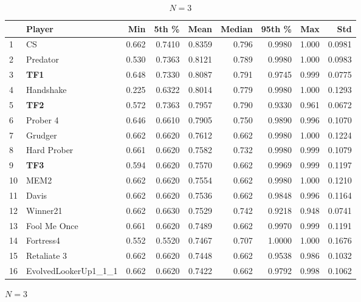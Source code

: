 \documentclass[10pt,letterpaper]{article}
\begin{document}
\begin{table}[!hbtp]
    \tiny
    \centering
    \begin{subfigure}[t]{\columnwidth}
        \centering
            \begin{tabular}{llrrrrrrr}
            \toprule
            {} &                Player &    Min &   5th \% &    Mean &  Median &  95th \% &    Max &     Std \\
            \midrule
            1  &                    CS &  0.662 &  0.7410 &  0.8359 &   0.796 &  0.9980 &  1.000 &  0.0981 \\
            2  &              Predator &  0.530 &  0.7363 &  0.8121 &   0.789 &  0.9980 &  1.000 &  0.0983 \\
            3  &                   \textbf{TF1} &  0.648 &  0.7330 &  0.8087 &   0.791 &  0.9745 &  0.999 &  0.0775 \\
            4  &             Handshake &  0.225 &  0.6322 &  0.8014 &   0.779 &  0.9980 &  1.000 &  0.1293 \\
            5  &                   \textbf{TF2} &  0.572 &  0.7363 &  0.7957 &   0.790 &  0.9330 &  0.961 &  0.0672 \\
            6  &              Prober 4 &  0.646 &  0.6610 &  0.7905 &   0.750 &  0.9890 &  0.996 &  0.1070 \\
            7  &               Grudger &  0.662 &  0.6620 &  0.7612 &   0.662 &  0.9980 &  1.000 &  0.1224 \\
            8  &           Hard Prober &  0.661 &  0.6620 &  0.7582 &   0.732 &  0.9980 &  0.999 &  0.1079 \\
            9  &                   \textbf{TF3} &  0.594 &  0.6620 &  0.7570 &   0.662 &  0.9969 &  0.999 &  0.1197 \\
            10 &                  MEM2 &  0.662 &  0.6620 &  0.7554 &   0.662 &  0.9980 &  1.000 &  0.1210 \\
            11 &                 Davis &  0.662 &  0.6620 &  0.7536 &   0.662 &  0.9848 &  0.996 &  0.1164 \\
            12 &              Winner21 &  0.662 &  0.6630 &  0.7529 &   0.742 &  0.9218 &  0.948 &  0.0741 \\
            13 &          Fool Me Once &  0.661 &  0.6620 &  0.7489 &   0.662 &  0.9970 &  0.999 &  0.1191 \\
            14 &             Fortress4 &  0.552 &  0.5520 &  0.7467 &   0.707 &  1.0000 &  1.000 &  0.1676 \\
            15 &           Retaliate 3 &  0.662 &  0.6620 &  0.7448 &   0.662 &  0.9538 &  0.986 &  0.1032 \\
            16 &  EvolvedLookerUp1\_1\_1 &  0.662 &  0.6620 &  0.7422 &   0.662 &  0.9792 &  0.998 &  0.1062 \\
            \bottomrule
            \end{tabular}
        \caption{\(N=3\)}
    \end{subfigure}%


\end{table}
\end{document}
